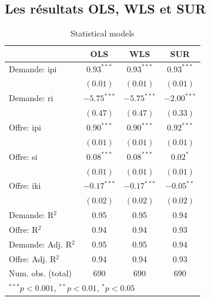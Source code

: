 \documentclass[11pt,]{article}
\begin{document}
\FloatBarrier

\FloatBarrier

\hypertarget{les-resultats-ols-wls-et-sur}{%
\subsection{Les résultats OLS, WLS et
SUR}\label{les-resultats-ols-wls-et-sur}}

\FloatBarrier

\FloatBarrier

\FloatBarrier

\begin{table}
\begin{center}
\begin{tabular}{l c c c }
\hline
 & OLS & WLS & SUR \\
\hline
Demande: ipi        & $0.93^{***}$  & $0.93^{***}$  & $0.93^{***}$  \\
                    & $(0.01)$      & $(0.01)$      & $(0.01)$      \\
Demande: ri         & $-5.75^{***}$ & $-5.75^{***}$ & $-2.00^{***}$ \\
                    & $(0.47)$      & $(0.47)$      & $(0.33)$      \\
Offre: ipi          & $0.90^{***}$  & $0.90^{***}$  & $0.92^{***}$  \\
                    & $(0.01)$      & $(0.01)$      & $(0.01)$      \\
Offre: si           & $0.08^{***}$  & $0.08^{***}$  & $0.02^{*}$    \\
                    & $(0.01)$      & $(0.01)$      & $(0.01)$      \\
Offre: iki          & $-0.17^{***}$ & $-0.17^{***}$ & $-0.05^{**}$  \\
                    & $(0.02)$      & $(0.02)$      & $(0.02)$      \\
\hline
Demande: R$^2$      & 0.95          & 0.95          & 0.94          \\
Offre: R$^2$        & 0.94          & 0.94          & 0.93          \\
Demande: Adj. R$^2$ & 0.95          & 0.95          & 0.94          \\
Offre: Adj. R$^2$   & 0.94          & 0.94          & 0.93          \\
Num. obs. (total)   & 690           & 690           & 690           \\
\hline
\multicolumn{4}{l}{\scriptsize{$^{***}p<0.001$, $^{**}p<0.01$, $^*p<0.05$}}
\end{tabular}
\caption{Statistical models}
\label{table : ols, wls and sur}
\end{center}
\end{table}
\end{document}
